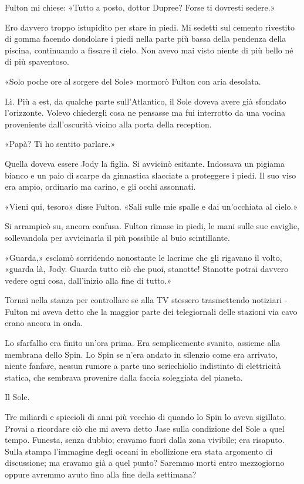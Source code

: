 Fulton mi chiese: «Tutto a posto, dottor Dupree? Forse ti dovresti
sedere.»

Ero davvero troppo istupidito per stare in piedi. Mi sedetti sul cemento
rivestito di gomma facendo dondolare i piedi nella parte più bassa della
pendenza della piscina, continuando a fissare il cielo. Non avevo mai
visto niente di più bello né di più spaventoso.

«Solo poche ore al sorgere del Sole» mormorò Fulton con aria desolata.

Lì. Più a est, da qualche parte sull'Atlantico, il Sole doveva avere già
sfondato l'orizzonte. Volevo chiedergli cosa ne pensasse ma fui
interrotto da una vocina proveniente dall'oscurità vicino alla porta
della reception.

«Papà? Ti ho sentito parlare.»

Quella doveva essere Jody la figlia. Si avvicinò esitante. Indossava un
pigiama bianco e un paio di scarpe da ginnastica slacciate a proteggere
i piedi. Il suo viso era ampio, ordinario ma carino, e gli occhi
assonnati.

«Vieni qui, tesoro» disse Fulton. «Sali sulle mie spalle e dai
un'occhiata al cielo.»

Si arrampicò su, ancora confusa. Fulton rimase in piedi, le mani sulle
sue caviglie, sollevandola per avvicinarla il più possibile al buio
scintillante.

«Guarda,» esclamò sorridendo nonostante le lacrime che gli rigavano il
volto, «guarda là, Jody. Guarda tutto ciò che puoi, stanotte! Stanotte
potrai davvero vedere ogni cosa, dall'inizio alla fine di tutto.»

\separatorefiori

Tornai nella stanza per controllare se alla TV stessero trasmettendo
notiziari - Fulton mi aveva detto che la maggior parte dei telegiornali
delle stazioni via cavo erano ancora in onda.

Lo sfarfallio era finito un'ora prima. Era semplicemente svanito,
assieme alla membrana dello Spin. Lo Spin se n'era andato in silenzio
come era arrivato, niente fanfare, nessun rumore a parte uno
scricchiolio indistinto di elettricità statica, che sembrava provenire
dalla faccia soleggiata del pianeta.

Il Sole.

Tre miliardi e spiccioli di anni più vecchio di quando lo Spin lo aveva
sigillato. Provai a ricordare ciò che mi aveva detto Jase sulla
condizione del Sole a quel tempo. Funesta, senza dubbio; eravamo fuori
dalla zona vivibile; era risaputo. Sulla stampa l'immagine degli oceani
in ebollizione era stata argomento di discussione; ma eravamo già a quel
punto? Saremmo morti entro mezzogiorno oppure avremmo avuto fino alla
fine della settimana?

